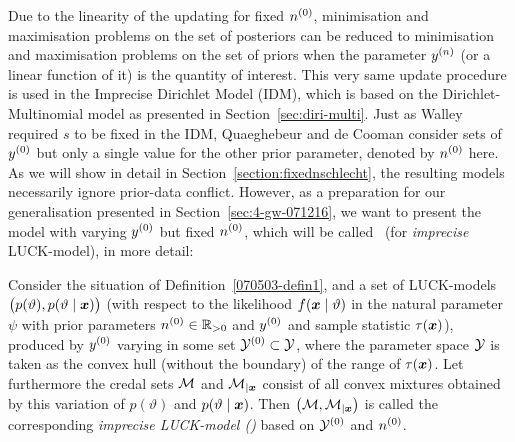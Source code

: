 Due to the linearity of the updating for fixed $n^{(0)}$, minimisation and maximisation problems on the set of
posteriors can be reduced to minimisation and maximisation problems
on the set of priors when the parameter $y^{(n)}$ (or a linear function of it) is the quantity of interest. This
very same update procedure is used in the Imprecise Dirichlet Model
(IDM), which is based on the Dirichlet-Multinomial model as
presented in Section~\ref{sec:diri-multi}.
Just as Walley required $s$ to be fixed in the IDM, Quaeghebeur
and de Cooman consider sets of $y^{(0)}$ but only a single value for
the other prior parameter, denoted by $n^{(0)}$ here. As we will show
in detail in Section~\ref{section:fixednschlecht}, the resulting models
necessarily ignore prior-data conflict. However, as a
preparation for our generalisation presented in
Section~\ref{sec:4-gw-071216}, we want to present the model with
varying $y^{(0)}$ but fixed $n^{(0)}$, which will be called \ymodel\ (for
\emph{imprecise} LUCK-model), in more detail:
%
%
%
\begin{definition}\label{071219-def2}
Consider the situation of Definition~\ref{070503-defin1},
and a set of LUCK-models $\big(p(\vartheta),p(\vartheta\mid{\bm x})\big)$
(with respect to the likelihood $f({\bm x}\mid\vartheta)$ in the natural
parameter $\psi$ with prior parameters $n^{(0)} \in \mathbb{R}_{>0}$ and
$y^{(0)}$ and sample statistic $\tau({\bm x})$), produced by $y^{(0)}$
varying in some set $\mathcal{Y}^{(0)} \subset \mathcal{Y}$, where the
parameter space $\mathcal{Y}$ is taken as the convex hull (without
the boundary) of the range of $\tau({\bm x})$. Let furthermore the credal
sets ${\cal M}$ and ${\cal M}_{|{\bm x}}$ consist of all convex mixtures
obtained by this variation of $p(\vartheta)$ and $p(\vartheta\mid{\bm x})$.
Then $\big({\cal M}, {\cal M}_{|{\bm x}}\big)$ is called the corresponding
\emph{imprecise LUCK-model (\ymodel)} based on $\mathcal{Y}^{(0)}$ and $n^{(0)}$.
\end{definition}

